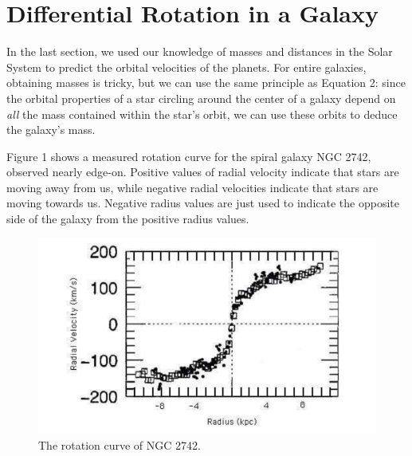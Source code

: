 \documentclass[11pt]{article}%
\begin{document}
\break
\section{Differential Rotation in a Galaxy}

\noindent
In the last section, we used our knowledge of masses and distances in the Solar System to predict the orbital velocities of the planets. For entire galaxies, obtaining masses is tricky, but we can use the same principle as Equation 2: since the orbital properties of a star circling around the center of a galaxy depend on \emph{all} the mass contained within the star's orbit, we can use these orbits to deduce the galaxy's mass. 

Figure 1 shows a measured rotation curve for the spiral galaxy NGC 2742, observed nearly edge-on. Positive values of radial velocity indicate that stars are moving away from us, while negative radial velocities indicate that stars are moving towards us. Negative radius values are just used to indicate the opposite side of the galaxy from the positive radius values. 

\begin{figure}[h!]
\center
\includegraphics[scale=0.6]{rotation_curve.png}
\caption{The rotation curve of NGC 2742.}
\label{rotcurve}
\end{figure}
\end{document}
